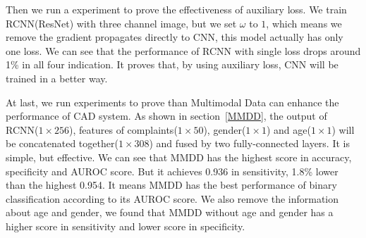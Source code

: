 \documentclass[journal]{IEEEtran}
\begin{document}
Then we run a experiment to prove the effectiveness of auxiliary loss. We train RCNN(ResNet) with three channel image, but we set $\omega$ to $1$, which means we remove the gradient propagates directly to CNN, this model actually has only one loss. We can see that the performance of RCNN with single loss drops around 1\% in all four indication. It proves that, by using auxiliary loss, CNN will be trained in a better way. 

At last, we run experiments to prove than Multimodal Data can enhance the performance of CAD system. As shown in section~\ref{MMDD}, the output of RCNN($1 \times 256$), features of complaints($1 \times 50$), gender($1 \times 1$) and age($1 \times 1$) will be concatenated together($1 \times 308$) and fused by two fully-connected layers. It is simple, but effective. We can see that MMDD has the highest score in accuracy, specificity and AUROC score. But it achieves 0.936 in sensitivity, 1.8\% lower than the highest 0.954. It means MMDD has the best performance of binary classification according to its AUROC score. We also remove the information about age and gender, we found that MMDD without age and gender has a higher score in sensitivity and lower score in specificity. 
\end{document}

